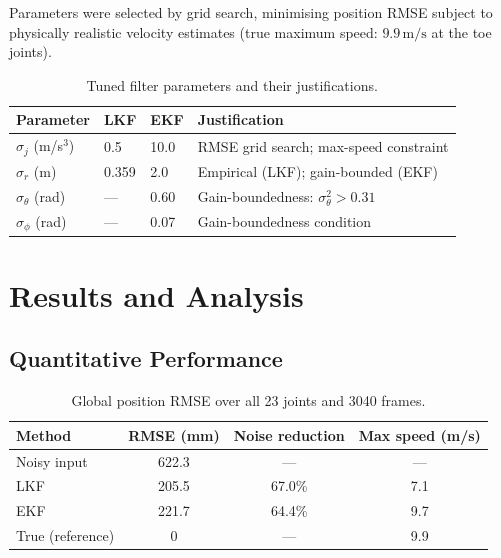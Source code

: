 \documentclass[11pt, a4paper]{article}
\begin{document}
Parameters were selected by grid search, minimising position RMSE subject to
physically realistic velocity estimates (true maximum speed: $9.9\,\text{m/s}$
at the toe joints).

\begin{table}[H]
\centering
\caption{Tuned filter parameters and their justifications.}
\begin{tabular}{llll}
\toprule
Parameter & LKF & EKF & Justification \\
\midrule
$\sigma_j$ (m/s$^3$)  & 0.5   & 10.0 & RMSE grid search; max-speed constraint \\
$\sigma_r$ (m)        & 0.359 & 2.0  & Empirical (LKF); gain-bounded (EKF) \\
$\sigma_\theta$ (rad) & ---   & 0.60 & Gain-boundedness: $\sigma_\theta^2 > 0.31$ \\
$\sigma_\phi$ (rad)   & ---   & 0.07 & Gain-boundedness condition \\
\bottomrule
\end{tabular}
\end{table}

\section{Results and Analysis}

\subsection{Quantitative Performance}

\begin{table}[H]
\centering
\caption{Global position RMSE over all 23 joints and 3040 frames.}
\begin{tabular}{lccc}
\toprule
Method           & RMSE (mm) & Noise reduction & Max speed (m/s) \\
\midrule
Noisy input      & 622.3     & ---             & ---  \\
LKF              & 205.5     & 67.0\%          & 7.1  \\
EKF              & 221.7     & 64.4\%          & 9.7  \\
True (reference) & 0         & ---             & 9.9  \\
\bottomrule
\end{tabular}
\end{table}
\end{document}
